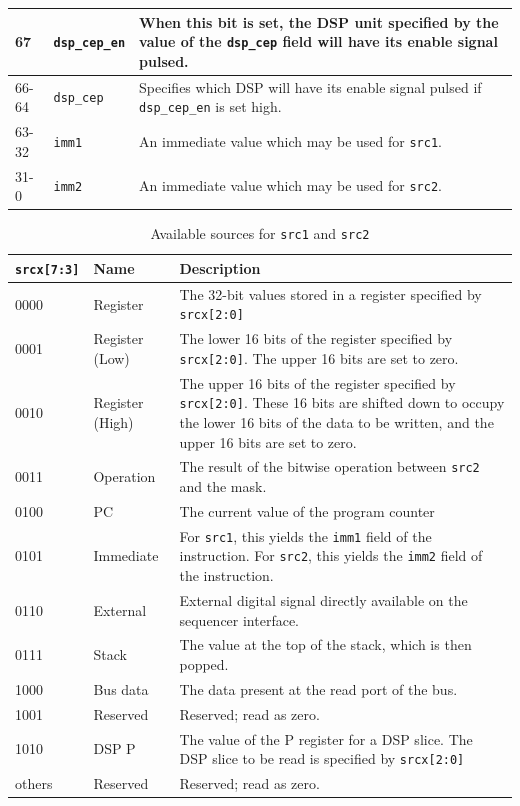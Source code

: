\begin{table}
\begin{tabular}{| m{1cm} | m{2.2cm} | m{8.5cm} |}
    \hline
    67 & \lstinline|dsp_cep_en| & When this bit is set, the DSP unit specified by the value of the \lstinline|dsp_cep| field will have its enable signal pulsed. \\
    \hline
    66-64 & \lstinline|dsp_cep| & Specifies which DSP will have its enable signal pulsed if \lstinline|dsp_cep_en| is set high. \\
    \hline
    63-32 & \lstinline|imm1| & An immediate value which may be used for \lstinline|src1|. \\
    \hline
    31-0 & \lstinline|imm2| & An immediate value which may be used for \lstinline|src2|. \\
    \hline
  \end{tabular} 
\end{table}

\begin{table}
  \centering
  \caption{Available sources for \lstinline|src1| and \lstinline|src2|}
  \label{tab_srcs}
  \begin{tabular}{| m{1.8cm} | m{2cm} | m{8.5cm} |} 
    \hline
    \textbf{\lstinline|srcx[7:3]|} & \textbf{Name} & \textbf{Description} \\
    \hline
    0000 & Register & The 32-bit values stored in a register specified by \lstinline|srcx[2:0]| \\
    \hline
    0001 & Register (Low) & The lower 16 bits of the register specified by \lstinline|srcx[2:0]|. The upper 16 bits are set to zero. \\
    \hline
    0010 & Register (High) & The upper 16 bits of the register specified by \lstinline|srcx[2:0]|. These 16 bits are shifted down to occupy the lower 16 bits of the data to be written, and the upper 16 bits are set to zero. \\
    \hline
    0011 & Operation & The result of the bitwise operation between \lstinline|src2| and the mask. \\
    \hline
    0100 & PC & The current value of the program counter \\
    \hline
    0101 & Immediate & For \lstinline|src1|, this yields the \lstinline|imm1| field of the instruction. For \lstinline|src2|, this yields the \lstinline|imm2| field of the instruction. \\
    \hline
    0110 & External & External digital signal directly available on the sequencer interface. \\
    \hline
    0111 & Stack & The value at the top of the stack, which is then popped. \\
    \hline
    1000 & Bus data & The data present at the read port of the bus. \\
    \hline
    1001 & Reserved & Reserved; read as zero. \\
    \hline
    1010 & DSP P & The value of the P register for a DSP slice. The DSP slice to be read is specified by \lstinline|srcx[2:0]| \\
    \hline
    others & Reserved & Reserved; read as zero. \\
    \hline
  \end{tabular}
\end{table}

